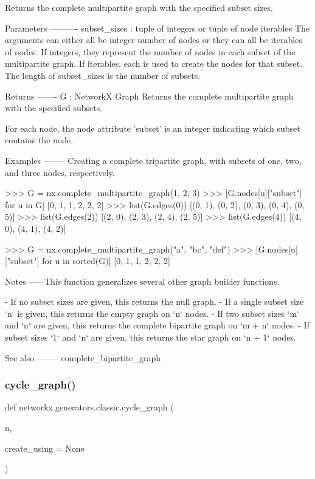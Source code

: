 \begin{DoxyVerb}Returns the complete multipartite graph with the specified subset sizes.

Parameters
----------
subset_sizes : tuple of integers or tuple of node iterables
   The arguments can either all be integer number of nodes or they
   can all be iterables of nodes. If integers, they represent the
   number of nodes in each subset of the multipartite graph.
   If iterables, each is used to create the nodes for that subset.
   The length of subset_sizes is the number of subsets.

Returns
-------
G : NetworkX Graph
   Returns the complete multipartite graph with the specified subsets.

   For each node, the node attribute 'subset' is an integer
   indicating which subset contains the node.

Examples
--------
Creating a complete tripartite graph, with subsets of one, two, and three
nodes, respectively.

    >>> G = nx.complete_multipartite_graph(1, 2, 3)
    >>> [G.nodes[u]["subset"] for u in G]
    [0, 1, 1, 2, 2, 2]
    >>> list(G.edges(0))
    [(0, 1), (0, 2), (0, 3), (0, 4), (0, 5)]
    >>> list(G.edges(2))
    [(2, 0), (2, 3), (2, 4), (2, 5)]
    >>> list(G.edges(4))
    [(4, 0), (4, 1), (4, 2)]

    >>> G = nx.complete_multipartite_graph("a", "bc", "def")
    >>> [G.nodes[u]["subset"] for u in sorted(G)]
    [0, 1, 1, 2, 2, 2]

Notes
-----
This function generalizes several other graph builder functions.

- If no subset sizes are given, this returns the null graph.
- If a single subset size `n` is given, this returns the empty graph on
  `n` nodes.
- If two subset sizes `m` and `n` are given, this returns the complete
  bipartite graph on `m + n` nodes.
- If subset sizes `1` and `n` are given, this returns the star graph on
  `n + 1` nodes.

See also
--------
complete_bipartite_graph
\end{DoxyVerb}
 \mbox{\label{namespacenetworkx_1_1generators_1_1classic_a45238aab4d2cb9c9e6541b5e5a8de72c}} 
\subsubsection{\texorpdfstring{cycle\+\_\+graph()}{cycle\_graph()}}
{\footnotesize\ttfamily def networkx.\+generators.\+classic.\+cycle\+\_\+graph (\begin{DoxyParamCaption}\item[{}]{n,  }\item[{}]{create\+\_\+using = {\ttfamily None} }\end{DoxyParamCaption})}

